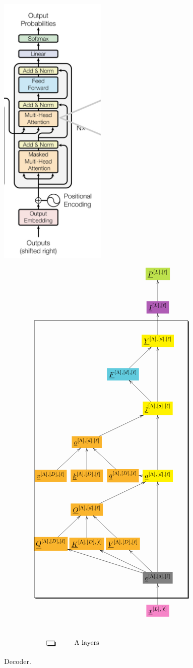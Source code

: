 \documentclass[12pt]{article}
\begin{document}
\begin{figure}[h!]\centering
\begin{minipage}{.4\linewidth}
\includegraphics[width=2in]{decoder.jpg}
\end{minipage}%
\begin{minipage}{.6\linewidth}
$$\xymatrix@R=2.5pc@C=0.2pc{
&&&*+[F*:SpringGreen]{\underline{P}^{[L],[\ell]}}
\\
&&&*+[F*:Orchid]{\underline{I}^{[L],[\ell]}}\ar[u]
\\
&&&*+[F*:yellow]{\underline{Y}^{[\Lambda],[d], [\ell]}}\ar[u]
\\
&&*+[F*:SkyBlue]{\underline{F}^{[\Lambda],[d], [\ell]}}\ar[ur]&
\\
&&&*+[F*:yellow]{\underline{j}^{[\Lambda],[d], [\ell]}}\ar[ul]\ar[uu]
\\
&*+[F*:Dandelion]{\underline{o}^{[\Lambda],[d],[\ell]}}\ar[urr]&&
\\
*+[F*:Dandelion]{\underline{v}^{[\Lambda],[D], [\ell]}}\ar[ur]&*+[F*:Dandelion]{\underline{k}^{[\Lambda],[D], [\ell]}}\ar[u]&*+[F*:Dandelion]{\underline{q}^{[\Lambda],[D], [\ell]}}\ar[ul]&*+[F*:yellow]{\underline{a}^{[\Lambda],[d], [\ell]}}\ar[uu]\ar[l]
\\
&*+[F*:Dandelion]{\underline{O}^{[\Lambda],[d],[\ell]}}\ar[urr]&&
\\
*+[F*:Dandelion]{\underline{Q}^{[\Lambda],[D], [\ell]}}\ar[ur]&*+[F*:Dandelion]{\underline{K}^{[\Lambda],[D], [\ell]}}\ar[u]&*+[F*:Dandelion]{\underline{V}^{[\Lambda],[D], [\ell]}}\ar[ul]&
\\
&&&*+[F*:gray]{\underline{e}^{[\Lambda],[d],[\ell]}}\ar[ull]\ar[ulll]\ar[ul]\ar[uuu]
\\
&&&*+[F*:Lavender]{\underline{x}^{[L],[\ell]}}\ar[u]
\save
\POS"3,1"."10,1"."3,4"."10,4"!C*+<4.0em>\frm{-,}
\restore
\\
*+[F-,]{\;\;}&\text{$\Lambda$ layers}
}$$
\end{minipage}
\caption{Decoder.}
\label{fig-texnn-for-decoder}
\end{figure}
\end{document}
